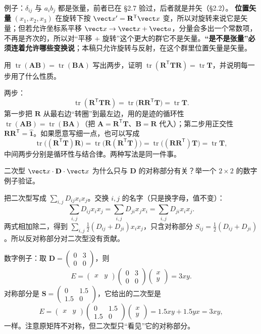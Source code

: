 \documentclass[11pt]{ctexart}
\newcommand{\ten}[1]{\mathbf{#1}}
\newcommand{\unitd}{\hat{\ten{1}}}
\newcommand{\tr}{\operatorname{tr}}
\begin{document}
例子：$\delta_{ij}$ 与 $a_ib_j$ 都是张量，前者已在 §2.7 验过，后者就是并矢（§2.2）。
\textbf{位置矢量} $(x_1,x_2,x_3)$ 在旋转下按 $\vect x'=\ten R^{\mathsf T}\vect x$ 变，所以对旋转来说它是矢量；但若允许坐标系平移 $\vect x\to\vect x+\vect a$，分量会多出一个常数项，不再是齐次的，所以对“平移 + 旋转”这个更大的群它不是矢量。\textbf{“是不是张量”必须连着允许哪些变换说}；本稿只允许旋转与反射，在这个群里位置矢量是矢量。

{用 $\tr(\ten A\ten B)=\tr(\ten B\ten A)$ 写出两步，证明 $\tr(\ten R^{\mathsf T}\ten T\ten R)=\tr\ten T$，并说明每一步用了什么性质。}

两步：
\[
\tr(\ten R^{\mathsf T}\ten T\ten R)
=\tr\bigl(\ten R\ten R^{\mathsf T}\ten T\bigr)
=\tr\ten T .
\]
第一步把 $\ten R$ 从最右边“转圈”到最左边，用的是迹的循环性 $\tr(\ten A\ten B)=\tr(\ten B\ten A)$（把 $\ten A=\ten R^{\mathsf T}\ten T$、$\ten B=\ten R$ 代入）；第二步用正交性 $\ten R\ten R^{\mathsf T}=\unitd$。如果愿意写细一点，也可以写成
\[
\tr\bigl((\ten R^{\mathsf T}\ten T)\ten R\bigr)
=\tr\bigl(\ten R(\ten R^{\mathsf T}\ten T)\bigr)
=\tr\bigl((\ten R\ten R^{\mathsf T})\ten T\bigr)
=\tr\ten T,
\]
中间两步分别是循环性与结合律。两种写法是同一件事。

{二次型 $\vect x\cdot\ten D\cdot\vect x$ 为什么只与 $\ten D$ 的对称部分有关？举一个 $2\times2$ 的数字例子验证。}

把二次型写成 $\sum_{i,j}D_{ij}x_ix_j$。交换 $i,j$ 的名字（只是换字母，值不变）：
\[
\sum_{i,j}D_{ij}x_ix_j=\sum_{i,j}D_{ji}x_jx_i=\sum_{i,j}D_{ji}x_ix_j .
\]
两式相加除二，得到 $\sum_{i,j}\tfrac12(D_{ij}+D_{ji})x_ix_j$，只含对称部分 $S_{ij}=\tfrac12(D_{ij}+D_{ji})$。所以反对称部分对二次型没有贡献。

数字例子：取 $\ten D=\begin{pmatrix}0&3\\0&0\end{pmatrix}$，则
\[
E=\begin{pmatrix}x&y\end{pmatrix}\begin{pmatrix}0&3\\0&0\end{pmatrix}\begin{pmatrix}x\\y\end{pmatrix}=3xy .
\]
对称部分是 $\ten S=\begin{pmatrix}0&1.5\\1.5&0\end{pmatrix}$，它给出的二次型是
\[
E=\begin{pmatrix}x&y\end{pmatrix}\begin{pmatrix}0&1.5\\1.5&0\end{pmatrix}\begin{pmatrix}x\\y\end{pmatrix}=1.5xy+1.5yx=3xy,
\]
一样。注意原矩阵不对称，但二次型只“看见”它的对称部分。
\end{document}

